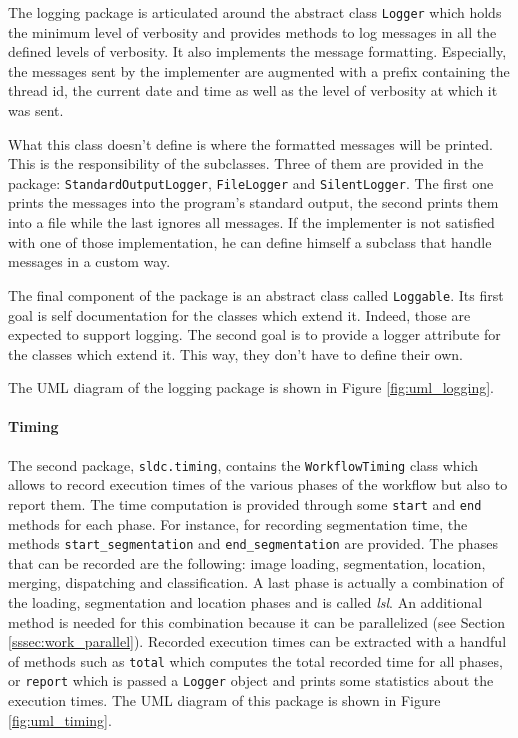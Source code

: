 The logging package is articulated around the abstract class \texttt{Logger} which holds the minimum level of verbosity and provides methods to log messages in all the defined levels of verbosity. It also implements the message formatting. Especially, the messages sent by the implementer are augmented with a prefix containing the thread id, the current date and time as well as the level of verbosity at which it was sent. 

What this class doesn't define is where the formatted messages will be printed. This is the responsibility of the subclasses. Three of them are provided in the package: \texttt{StandardOutputLogger}, \texttt{FileLogger} and \texttt{SilentLogger}. The first one prints the messages into the program's standard output, the second prints them into a file while the last ignores all messages. If the implementer is not satisfied with one of those implementation, he can define himself a subclass that handle messages in a custom way. 

The final component of the package is an abstract class called \texttt{Loggable}. Its first goal is self documentation for the classes which extend it. Indeed, those are expected to support logging. The second goal is to provide a logger attribute for the classes which extend it. This way, they don't have to define their own. 

The UML diagram of the logging package is shown in Figure \ref{fig:uml_logging}.

\paragraph{Timing} The second package, \texttt{sldc.timing}, contains the \texttt{WorkflowTiming} class which allows to record execution times of the various phases of the workflow but also to report them. The time computation is provided through some \texttt{start} and \texttt{end} methods for each phase. For instance, for recording segmentation time, the methods \texttt{start\_segmentation} and \texttt{end\_segmentation} are provided. The phases that can be recorded are the following: image loading, segmentation, location, merging, dispatching and classification. A last phase is actually a combination of the loading, segmentation and location phases and is called \textit{lsl}. An additional method is needed for this combination because it can be parallelized (see Section \ref{sssec:work_parallel}). Recorded execution times can be extracted with a handful of methods such as \texttt{total} which computes the total recorded time for all phases, or \texttt{report} which is passed a \texttt{Logger} object and prints some statistics about the execution times. The UML diagram of this package is shown in Figure \ref{fig:uml_timing}.


